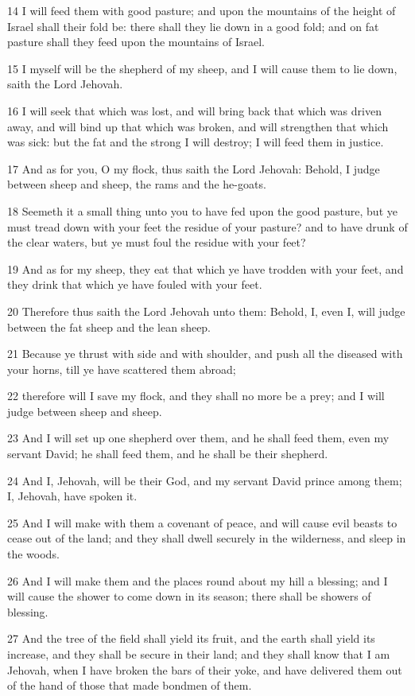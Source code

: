 \par 14 I will feed them with good pasture; and upon the mountains of the height of Israel shall their fold be: there shall they lie down in a good fold; and on fat pasture shall they feed upon the mountains of Israel.
\par 15 I myself will be the shepherd of my sheep, and I will cause them to lie down, saith the Lord Jehovah.
\par 16 I will seek that which was lost, and will bring back that which was driven away, and will bind up that which was broken, and will strengthen that which was sick: but the fat and the strong I will destroy; I will feed them in justice.
\par 17 And as for you, O my flock, thus saith the Lord Jehovah: Behold, I judge between sheep and sheep, the rams and the he-goats.
\par 18 Seemeth it a small thing unto you to have fed upon the good pasture, but ye must tread down with your feet the residue of your pasture? and to have drunk of the clear waters, but ye must foul the residue with your feet?
\par 19 And as for my sheep, they eat that which ye have trodden with your feet, and they drink that which ye have fouled with your feet.
\par 20 Therefore thus saith the Lord Jehovah unto them: Behold, I, even I, will judge between the fat sheep and the lean sheep.
\par 21 Because ye thrust with side and with shoulder, and push all the diseased with your horns, till ye have scattered them abroad;
\par 22 therefore will I save my flock, and they shall no more be a prey; and I will judge between sheep and sheep.
\par 23 And I will set up one shepherd over them, and he shall feed them, even my servant David; he shall feed them, and he shall be their shepherd.
\par 24 And I, Jehovah, will be their God, and my servant David prince among them; I, Jehovah, have spoken it.
\par 25 And I will make with them a covenant of peace, and will cause evil beasts to cease out of the land; and they shall dwell securely in the wilderness, and sleep in the woods.
\par 26 And I will make them and the places round about my hill a blessing; and I will cause the shower to come down in its season; there shall be showers of blessing.
\par 27 And the tree of the field shall yield its fruit, and the earth shall yield its increase, and they shall be secure in their land; and they shall know that I am Jehovah, when I have broken the bars of their yoke, and have delivered them out of the hand of those that made bondmen of them.
